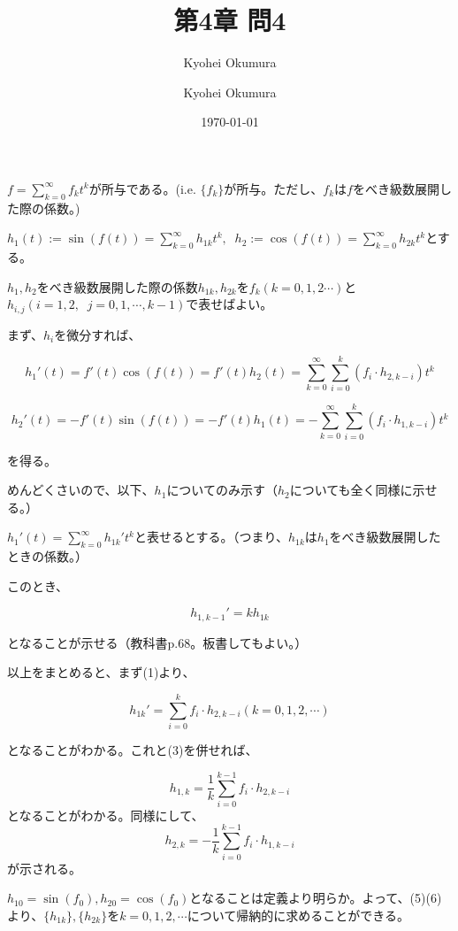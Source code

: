\documentclass[11pt,a4paper]{article}
\author{Kyohei Okumura}
\begin{document}
\title{第4章 問4}
\author{Kyohei Okumura}
\date{\today}
\maketitle

$f = \displaystyle{\sum_{k=0}^\infty f_k t^k}$が所与である。(i.e. $\{f_k\}$が所与。ただし、$f_k$は$f$をべき級数展開した際の係数。)

$\displaystyle{ h_1(t):= \sin(f(t)) = \sum_{k=0}^\infty h_{1k}t^k, \;\; h_2 := \cos(f(t)) = \sum_{k=0}^\infty h_{2k}t^k}$とする。

$h_1,h_2$をべき級数展開した際の係数$h_{1k}, h_{2k}$を$f_k(k=0,1,2 \cdots)$と$h_{i,j}(i=1,2, \;\; j=0,1,\cdots,k-1)$で表せばよい。

まず、$h_{i}$を微分すれば、

\begin{equation}
h_1'(t) = f'(t) \cos(f(t)) = f'(t)h_2(t) = \sum_{k=0}^\infty \sum_{i=0}^k (f_i \cdot h_{2,k-i})t^k
\end{equation}

\begin{equation}
h_2'(t) = -f'(t) \sin(f(t)) = -f'(t)h_1(t) = -\sum_{k=0}^\infty \sum_{i=0}^k (f_i \cdot h_{1,k-i})t^k
\end{equation}

を得る。

めんどくさいので、以下、$h_1$についてのみ示す（$h_2$についても全く同様に示せる。）

$\displaystyle{h_1'(t) = \sum_{k=0}^\infty h_{1k}'t^k}$と表せるとする。（つまり、$h_{1k}$は$h_1$をべき級数展開したときの係数。）

このとき、

\begin{equation}
h_{1,k-1}' = kh_{1k}
\end{equation}

となることが示せる（教科書p.68。板書してもよい。）

以上をまとめると、まず(1)より、

\begin{equation}
h_{1k}' = \sum_{i=0}^k f_i \cdot h_{2,k-i} (k=0,1,2,\cdots)
\end{equation}

となることがわかる。これと(3)を併せれば、

\begin{equation}
h_{1,k} = \frac{1}{k} \sum_{i=0}^{k-1} f_i \cdot h_{2,k-i} 
\end{equation}
となることがわかる。同様にして、
\begin{equation}
h_{2,k} = - \frac{1}{k} \sum_{i=0}^{k-1} f_i \cdot h_{1,k-i} 
\end{equation}
が示される。

$h_{10} = \sin(f_0), h_{20} = \cos(f_0)$となることは定義より明らか。よって、(5)(6)より、$\{h_{1k}\},\{h_{2k}\}$を$k=0,1,2,\cdots$について帰納的に求めることができる。
\end{document}
